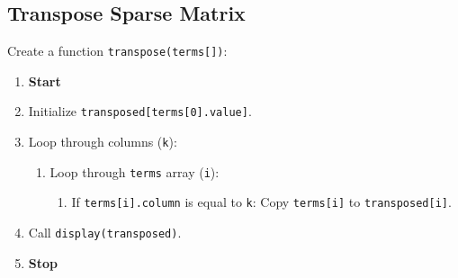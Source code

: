 \subsection{Transpose Sparse Matrix}
Create a function \texttt{transpose(terms[])}:
\begin{enumerate}
  \item \textbf{Start}
  \item Initialize \texttt{transposed[terms[0].value]}.
  \item Loop through columns (\texttt{k}):
        \begin{enumerate}[label=2.\arabic*:]
          \item Loop through \texttt{terms} array (\texttt{i}):
                \begin{enumerate}[label=2.1.\arabic*:]
                  \item If \texttt{terms[i].column} is equal to \texttt{k}:
                        Copy \texttt{terms[i]} to \texttt{transposed[i]}.
                \end{enumerate}
        \end{enumerate}
  \item Call \texttt{display(transposed)}.
  \item \textbf{Stop}
\end{enumerate}

